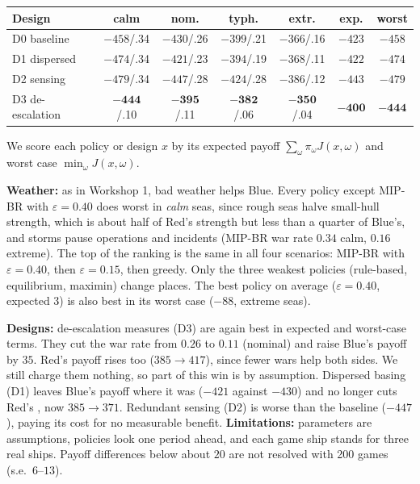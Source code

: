 \noindent\begin{minipage}[t]{0.47\textwidth}\vspace{0pt}\centering\footnotesize\setlength{\tabcolsep}{2pt}
{\begin{tabular}{l|cccc|cc}
\toprule
Design & calm & nom. & typh. & extr. & exp. & worst\\\midrule
D0 baseline   & $-458$/.34 & $-430$/.26 & $-399$/.21 & $-366$/.16 & $-423$ & $-458$\\
D1 dispersed  & $-474$/.34 & $-421$/.23 & $-394$/.19 & $-368$/.11 & $-422$ & $-474$\\
D2 sensing    & $-479$/.34 & $-447$/.28 & $-424$/.28 & $-386$/.12 & $-443$ & $-479$\\
D3 de-escalation & $\mathbf{-444}$/.10 & $\mathbf{-395}$/.11 & $\mathbf{-382}$/.06 & $\mathbf{-350}$/.04 & $\mathbf{-400}$ & $\mathbf{-444}$\\
\bottomrule
\end{tabular}}
\label{fig:rq3}
\smallskip\normalsize\raggedright We score each policy or design $x$ by its expected payoff
$\sum_\omega\pi_\omega J(x,\omega)$ and worst case $\min_\omega J(x,\omega)$.
\end{minipage}\hfill
\begin{minipage}[t]{0.51\textwidth}\vspace{0pt}
\textbf{Weather:} as in Workshop 1, bad weather helps Blue. Every policy except MIP-BR with $\varepsilon=0.40$ does
worst in \emph{calm} seas, since rough seas halve small-hull strength, which is about half of Red's strength but less than a quarter of
Blue's, and storms
pause operations and incidents (MIP-BR war rate $0.34$ calm, $0.16$ extreme). The top of the ranking is the same in all
four scenarios: MIP-BR with $\varepsilon=0.40$, then $\varepsilon=0.15$, then greedy. Only the three weakest policies
(rule-based, equilibrium, maximin) change places. The best policy on average ($\varepsilon=0.40$, expected $3$) is also
best in its worst case ($-88$, extreme seas).
\end{minipage}

\textbf{Designs:} de-escalation measures (D3) are again best in expected and worst-case terms. They cut the war rate
from $0.26$ to $0.11$ (nominal)  and raise Blue's payoff by $35$. Red's payoff rises too
($385\to417$), since fewer wars help both sides. We still charge them nothing, so part of this win is by assumption.
Dispersed basing (D1) leaves Blue's payoff where it was ($-421$ against $-430$) and no longer cuts Red's
, now $385\to371$. Redundant sensing (D2) is worse than the baseline ($-447$), paying its cost for no
measurable benefit.
\textbf{Limitations:} parameters are assumptions, policies look one period ahead, and each game ship stands for three
real ships. Payoff differences below about $20$ are not resolved with 200 games (s.e.\ $6$--$13$).
